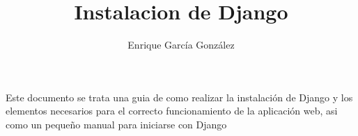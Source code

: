 \documentclass{article}
\title{Instalacion de Django}
\author{Enrique García González}
\begin{document}
\maketitle

Este documento se trata una guia de como realizar la instalación de Django y los elementos
necesarios para el correcto funcionamiento de la aplicación web, asi como un pequeño 
manual para iniciarse con Django

\newpage

\tableofcontents

\newpage







\end{document}
